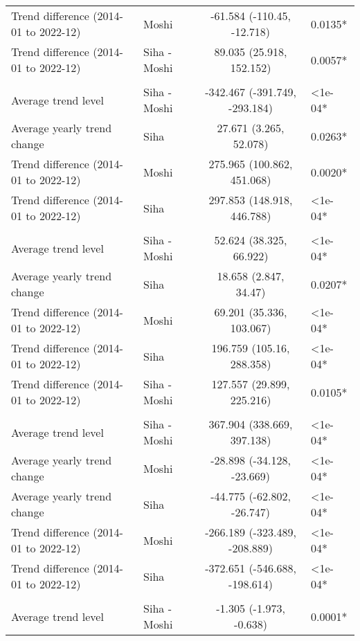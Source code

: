 \begin{longtable}{l|lcl}
Trend difference (2014-01 to 2022-12) & Moshi & -61.584 (-110.45, -12.718) & 0.0135* \\ 
Trend difference (2014-01 to 2022-12) & Siha - Moshi & 89.035 (25.918, 152.152) & 0.0057* \\ 
\midrule\addlinespace[2.5pt]
\multicolumn{4}{l}{Hypertension} \\ 
\midrule\addlinespace[2.5pt]
Average trend level & Siha - Moshi & -342.467 (-391.749, -293.184) & <1e-04* \\ 
Average yearly trend change & Siha & 27.671 (3.265, 52.078) & 0.0263* \\ 
Trend difference (2014-01 to 2022-12) & Moshi & 275.965 (100.862, 451.068) & 0.0020* \\ 
Trend difference (2014-01 to 2022-12) & Siha & 297.853 (148.918, 446.788) & <1e-04* \\ 
\midrule\addlinespace[2.5pt]
\multicolumn{4}{l}{Infectious Eye Disease} \\ 
\midrule\addlinespace[2.5pt]
Average trend level & Siha - Moshi & 52.624 (38.325, 66.922) & <1e-04* \\ 
Average yearly trend change & Siha & 18.658 (2.847, 34.47) & 0.0207* \\ 
Trend difference (2014-01 to 2022-12) & Moshi & 69.201 (35.336, 103.067) & <1e-04* \\ 
Trend difference (2014-01 to 2022-12) & Siha & 196.759 (105.16, 288.358) & <1e-04* \\ 
Trend difference (2014-01 to 2022-12) & Siha - Moshi & 127.557 (29.899, 225.216) & 0.0105* \\ 
\midrule\addlinespace[2.5pt]
\multicolumn{4}{l}{Intestinal Worms} \\ 
\midrule\addlinespace[2.5pt]
Average trend level & Siha - Moshi & 367.904 (338.669, 397.138) & <1e-04* \\ 
Average yearly trend change & Moshi & -28.898 (-34.128, -23.669) & <1e-04* \\ 
Average yearly trend change & Siha & -44.775 (-62.802, -26.747) & <1e-04* \\ 
Trend difference (2014-01 to 2022-12) & Moshi & -266.189 (-323.489, -208.889) & <1e-04* \\ 
Trend difference (2014-01 to 2022-12) & Siha & -372.651 (-546.688, -198.614) & <1e-04* \\ 
\midrule\addlinespace[2.5pt]
\multicolumn{4}{l}{Leprosy} \\ 
\midrule\addlinespace[2.5pt]
Average trend level & Siha - Moshi & -1.305 (-1.973, -0.638) & 0.0001* \\ 

\end{longtable}
